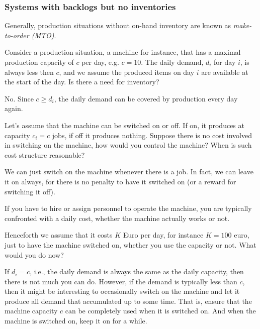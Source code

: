 \subsubsection{Systems with backlogs but no inventories}

Generally, production situations without on-hand inventory are known as \emph{make-to-order (MTO)}.

\begin{exercise}\label{ex:2}
  Consider a production situation, a machine for instance, that has a
 maximal production capacity of $c$ per day, e.g. $c=10$.  The daily demand,
  $d_i$ for day $i$, is always less then $c$, and we assume the
  produced items on day $i$ are available at the start of the day. Is
  there a need for inventory?


  \begin{solution}
No. Since $c\geq d_i$, the daily demand can be covered by production every day again.     
  \end{solution}
\end{exercise}

\begin{exercise}
  Let's assume that the machine can be switched on or off.  If on, it
  produces at capacity $c_i=c$ jobs, if off it produces nothing.  Suppose there is no cost involved in switching on the machine, how would you control the   machine?
When is such cost structure reasonable?
  \begin{solution}
    We can just switch on the machine whenever there is a job. In
    fact, we can leave it on always, for there is no penalty to have
    it switched on (or a reward for switching it off).


    If you have to hire or assign personnel to operate the machine, you
    are typically confronted with a daily cost, whether the machine
    actually works or not.
  \end{solution}
\end{exercise}


\begin{exercise}
  Henceforth we assume that it costs $K$ Euro per day, for instance
  $K=100$ euro, just to have the machine switched on, whether you use
  the capacity or not. What would you do now? 
  \begin{solution}
    If $d_i=c$, i.e., the daily demand is always the same as the daily
    capacity, then there is not much you can do. However, if the
    demand is typically less than $c$, then it might be interesting to
    occasionally switch on the machine and let it produce all demand
    that accumulated up to some time. That is, ensure that the machine capacity $c$ can
    be completely used when it is switched on.  And when the machine is switched on, keep it on for a while.
  \end{solution}
\end{exercise}



